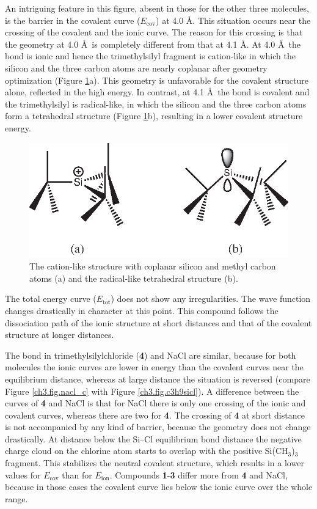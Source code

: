 An intriguing feature in this figure, absent in those for the other three molecules, is the barrier in the covalent curve ($E_\mathrm{cov}$) at 4.0 \AA. This situation occurs near the crossing of the covalent and the ionic curve. The reason for this crossing is that the geometry at 4.0 \AA\ is completely different from that at 4.1 \AA. At 4.0 \AA\ the bond is ionic and hence the trimethylsilyl fragment is cation-like in which the silicon and the three carbon atoms are nearly coplanar after geometry optimization (Figure \ref{ch3.fig.crossing}a). This geometry is unfavorable for the covalent structure alone, reflected in the high energy.  In contrast, at 4.1 \AA\  the bond is covalent and the trimethylsilyl is radical-like, in which the silicon and the three carbon atoms form a tetrahedral structure (Figure \ref{ch3.fig.crossing}b), resulting in a lower covalent structure energy. 
\begin{figure}[htbp]
\center
\includegraphics[scale=1.0]{dissociation/figures/crossing.eps}
\caption{The cation-like structure with coplanar silicon and methyl carbon atoms (a) and the radical-like tetrahedral structure (b).}
\label{ch3.fig.crossing}
\end{figure}
The total energy curve ($E_\mathrm{tot}$) does not show any irregularities.  The wave function changes drastically in character at this point. This compound follows the dissociation path of the ionic structure at short distances and that of the covalent structure at longer distances. 

The bond in trimethylsilylchloride (\textbf{4}) and NaCl are similar, because for both molecules the ionic curves are lower in energy than the covalent curves near the equilibrium distance, whereas at large distance the situation is reversed (compare Figure \ref{ch3.fig.nacl_c} with Figure \ref{ch3.fig.c3h9sicl}). A difference between the curves of \textbf{4} and NaCl is that for NaCl there is only one crossing of the ionic and covalent curves, whereas there are two for \textbf{4}. The crossing of \textbf{4} at short distance is not accompanied by any kind of barrier, because the geometry does not change drastically. At distance below the Si--Cl equilibrium bond distance the negative charge cloud on the chlorine atom starts to overlap with the positive Si(CH$_3$)$_3$ fragment. This stabilizes the neutral covalent structure, which results in a lower values for $E_\mathrm{cov}$ than for $E_\mathrm{ion}$. Compounds \textbf{1}-\textbf{3} differ more from \textbf{4} and NaCl, because in those cases the covalent curve lies below the ionic curve over the whole range.

